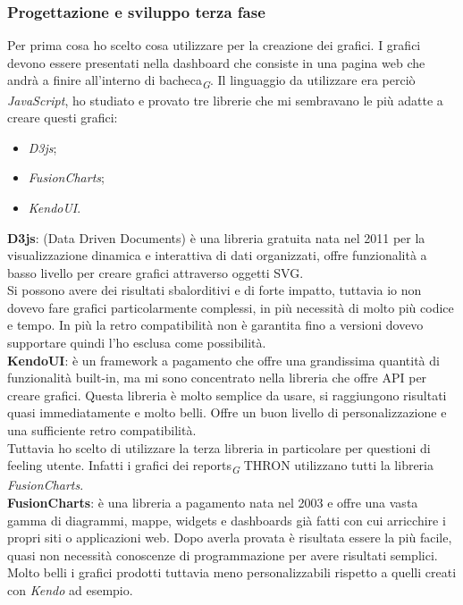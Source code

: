 \documentclass[a4paper, 12pt, twoside, openright]{book}
\newcommand{\gloss}[1]{#1\textsubscript{\textit{\tiny{G}}}}
\begin{document}
\subsubsection{Progettazione e sviluppo terza fase}
Per prima cosa ho scelto cosa utilizzare per la creazione dei grafici. I grafici devono essere presentati nella dashboard che consiste in una pagina web che andrà a finire all'interno di \gloss{bacheca}. Il linguaggio da utilizzare era perciò \textit{JavaScript}, ho studiato e provato tre librerie che mi sembravano le più adatte a creare questi grafici:
\begin{itemize}
	\item \textit{D3js};
	\item \textit{FusionCharts};
	\item \textit{KendoUI}.
\end{itemize}
\textbf{D3js}: (Data Driven Documents) è una libreria gratuita nata nel 2011 per la visualizzazione dinamica e interattiva di dati organizzati, offre funzionalità a basso livello per creare grafici attraverso oggetti SVG.\\
Si possono avere dei risultati sbalorditivi e di forte impatto, tuttavia io non dovevo fare grafici particolarmente complessi, in più necessità di molto più codice e tempo. In più la retro compatibilità non è garantita fino a versioni dovevo supportare quindi l'ho esclusa come possibilità.\\
\textbf{KendoUI}: è un framework a pagamento che offre una grandissima quantità di funzionalità built-in, ma mi sono concentrato nella libreria che offre API per creare grafici. Questa libreria è molto semplice da usare, si raggiungono risultati quasi immediatamente e molto belli. Offre un buon livello di personalizzazione e una sufficiente retro compatibilità.\\
Tuttavia ho scelto di utilizzare la terza libreria in particolare per questioni di feeling utente. Infatti i grafici dei \gloss{reports} THRON utilizzano tutti la libreria \textit{FusionCharts}.\\
\textbf{FusionCharts}: è una libreria a pagamento  nata nel 2003 e offre una vasta gamma di diagrammi, mappe, widgets e dashboards già fatti con cui arricchire i propri siti o applicazioni web. Dopo averla provata è risultata essere la più facile, quasi non necessità conoscenze di programmazione per avere risultati semplici. Molto belli i grafici prodotti tuttavia meno personalizzabili rispetto a quelli creati con \textit{Kendo} ad esempio.\\
\end{document}
